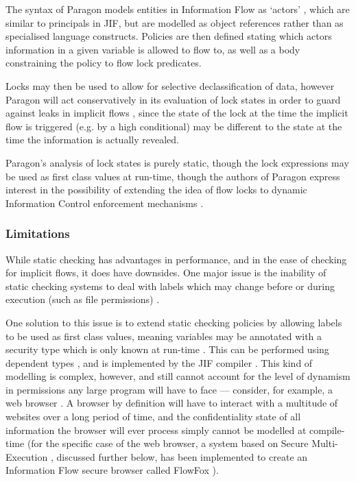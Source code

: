 The syntax of Paragon models entities in Information Flow as `actors' \cite{broberg2013paragon}, which are similar to principals in JIF, but are modelled as object references rather than as specialised language constructs. Policies are then defined stating which actors information in a given variable is allowed to flow to, as well as a body constraining the policy to flow lock predicates.

Locks may then be used to allow for selective declassification of data, however Paragon will act conservatively in its evaluation of lock states in order to guard against leaks in implicit flows \cite{broberg2013paragon}, since the state of the lock at the time the implicit flow is triggered (e.g. by a high conditional) may be different to the state at the time the information is actually revealed.

Paragon's analysis of lock states is purely static, though the lock expressions may be used as first class values at run-time, though the authors of Paragon express interest in the possibility of extending the idea of flow locks to dynamic Information Control enforcement mechanisms \cite{broberg2013paragon}.

\subsubsection{Limitations}

While static checking has advantages in performance, and in the ease of checking for implicit flows, it does have downsides. One major issue is the inability of static checking systems to deal with labels which may change before or during execution (such as file permissions) \cite{sabelfeld2003if}.

One solution to this issue is to extend static checking policies by allowing labels to be used as first class values, meaning variables may be annotated with a security type which is only known at run-time \cite{myers1997if}. This can be performed using dependent types \cite{xi1999dependenttypes}, and is implemented by the JIF compiler \cite{myers1999jif}. This kind of modelling is complex, however, and still cannot account for the level of dynamism in permissions any large program will have to face --- consider, for example, a web browser \cite{venkatakrishnan2006runtime}. A browser by definition will have to interact with a multitude of websites over a long period of time, and the confidentiality state of all information the browser will ever process simply cannot be modelled at compile-time (for the specific case of the web browser, a system based on Secure Multi-Execution \cite{devriese2010sme}, discussed further below, has been implemented to create an Information Flow secure browser called FlowFox \cite{degroef2012flowfox}).

